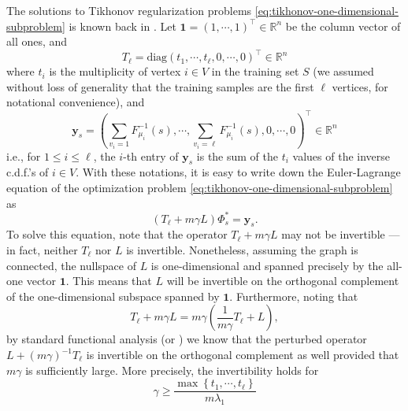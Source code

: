 \documentclass[letterpaper]{article} %
\begin{document}
The solutions to Tikhonov regularization problems \eqref{eq:tikhonov-one-dimensional-subproblem} is known back in \cite{Belkin2004}. Let $\mathbf{1}=\left( 1,\cdots,1 \right)^{\top}\in\mathbb{R}^n$ be the column vector of all ones, and
$$T_\ell=\mathrm{diag}\left( t_1,\cdots,t_{\ell},0,\cdots,0 \right)^{\top}\in\mathbb{R}^n$$
where $t_i$ is the multiplicity of vertex $i\in V$ in the training set $S$ (we assumed without loss of generality that the training samples are the first $\ell$ vertices, for notational convenience), and
\begin{equation}
  \label{eq:y-defn}
  \mathbf{y}_s=\left( \sum_{v_{i}=1}F_{\mu_i}^{-1}\left( s \right),\cdots,\sum_{v_i=\ell}F_{\mu_i}^{-1}\left( s \right),0,\cdots,0 \right)^{\top}\in\mathbb{R}^n
\end{equation}
i.e., for $1\leq i\leq \ell$, the $i$-th entry of $\mathbf{y}_s$ is the sum of the $t_i$ values of the inverse c.d.f.'s of $i\in V$. With these notations, it is easy to write down the Euler-Lagrange equation of the optimization problem \eqref{eq:tikhonov-one-dimensional-subproblem} as
\begin{equation}
  \label{eq:tikhonov-one-dimensional-subproblem-euler-lagrange}
  \left( T_{\ell}+m\gamma L \right)\Phi_s^{*}=\mathbf{y}_s.
\end{equation}
To solve this equation, note that the operator  $T_{\ell}+m\gamma L$ may not be invertible --- in fact, neither $T_{\ell}$ nor $L$ is invertible. Nonetheless, assuming the graph is connected, the nullspace of $L$ is one-dimensional and spanned precisely by the all-one vector $\mathbf{1}$. This means that $L$ will be invertible on the orthogonal complement of the one-dimensional subspace spanned by $\mathbf{1}$. Furthermore, noting that
\begin{equation}
  \label{eq:standard-functional-analysis}
  T_{\ell}+m\gamma L=m\gamma \left( \frac{1}{m\gamma}T_{\ell}+L \right),
\end{equation}
by standard functional analysis (or \cite[Proof of Theorem 5]{Belkin2004}) we know that the perturbed operator $L+\left( m\gamma \right)^{-1}T_{\ell}$ is invertible on the orthogonal complement as well provided that $m\gamma$ is sufficiently large. More precisely, the invertibility holds for
\begin{equation*}
\gamma\geq \frac{\max \left\{ t_1,\cdots,t_{\ell} \right\}}{m\lambda_1}
\end{equation*}
\end{document}
